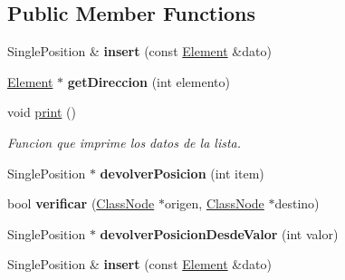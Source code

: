 \subsection*{Public Member Functions}
\begin{DoxyCompactItemize}
\item 
\mbox{\label{class_single_linked_list_aa94809f2f418d8ae0800c07ad2d3ed94}} 
Single\+Position \& {\bfseries insert} (const \hyperlink{class_element}{Element} \&dato)
\item 
\mbox{\label{class_single_linked_list_a22c895b2d3effcce5983b991a380027b}} 
\hyperlink{class_element}{Element} $\ast$ {\bfseries get\+Direccion} (int elemento)
\item 
\mbox{\label{class_single_linked_list_a64d9f3e1bad3eec787d2bcc7255c1311}} 
void \hyperlink{class_single_linked_list_a64d9f3e1bad3eec787d2bcc7255c1311}{print} ()
\begin{DoxyCompactList}\small\item\em Funcion que imprime los datos de la lista. \end{DoxyCompactList}\item 
\mbox{\label{class_single_linked_list_a09b8d66c2be112326210373514f32cd7}} 
Single\+Position $\ast$ {\bfseries devolver\+Posicion} (int item)
\item 
\mbox{\label{class_single_linked_list_aebc417269f785f2f8d3689403e7a6524}} 
bool {\bfseries verificar} (\hyperlink{class_class_node}{Class\+Node} $\ast$origen, \hyperlink{class_class_node}{Class\+Node} $\ast$destino)
\item 
\mbox{\label{class_single_linked_list_a2ed18090fd23eba38a668e40e0bca2c4}} 
Single\+Position $\ast$ {\bfseries devolver\+Posicion\+Desde\+Valor} (int valor)
\item 
\mbox{\label{class_single_linked_list_aa94809f2f418d8ae0800c07ad2d3ed94}} 
Single\+Position \& {\bfseries insert} (const \hyperlink{class_element}{Element} \&dato)
\item 
\mbox{\label{class_single_linked_list_a22c895b2d3effcce5983b991a380027b}} 

\end{DoxyCompactItemize}
